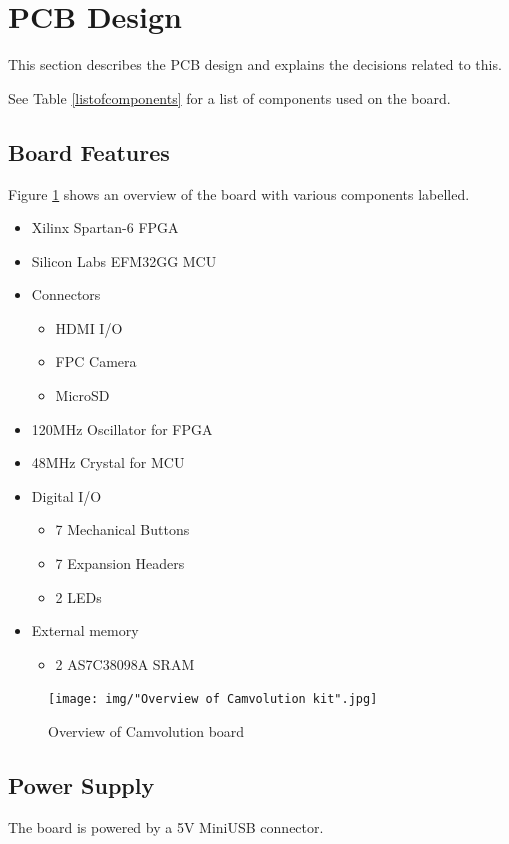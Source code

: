 \section{PCB Design}
This section describes the PCB design and explains the decisions related to this.

See Table \ref{listofcomponents} for a list of components used on the board.

\subsection{Board Features}
Figure \ref{fig:BoardLayout} shows an overview of the board with various components labelled.

\begin{itemize}
    \item Xilinx Spartan-6 FPGA
    \item Silicon Labs EFM32GG MCU
    \item Connectors
        \begin{itemize}
            \item HDMI I/O
            \item FPC Camera
            \item MicroSD
        \end{itemize}
    \item 120MHz Oscillator for FPGA
    \item 48MHz Crystal for MCU
    \item Digital I/O
        \begin{itemize}
            \item 7 Mechanical Buttons
            \item 7 Expansion Headers
            \item 2 LEDs
        \end{itemize}
    \item External memory
        \begin{itemize}
            \item 2 AS7C38098A SRAM
        \end{itemize}
\end{itemize}

\begin{figure}[h]
    \texttt{[image: img/"Overview of Camvolution kit".jpg]}
    \caption{Overview of Camvolution board}
    \label{fig:BoardLayout}
\end{figure}

\subsection{Power Supply}
The board is powered by a 5V MiniUSB connector.

